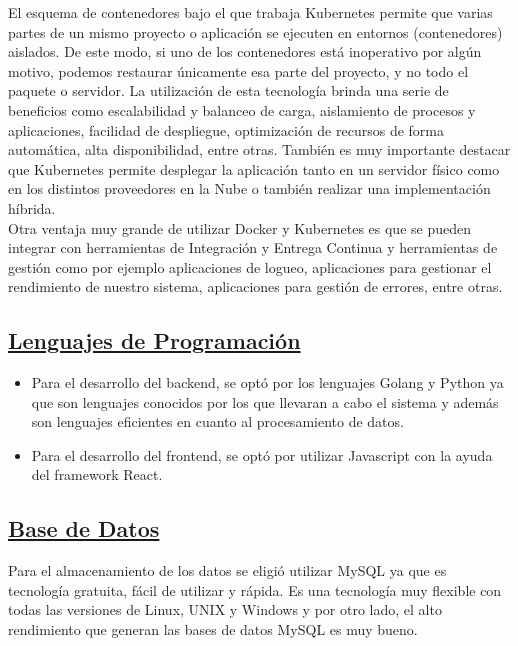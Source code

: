 El esquema de contenedores bajo el que trabaja Kubernetes permite que varias partes de un mismo proyecto o aplicación se ejecuten en entornos (contenedores) aislados. De este modo, si uno de los contenedores está inoperativo por algún motivo, podemos restaurar únicamente esa parte del proyecto, y no todo el paquete o servidor. La utilización de esta tecnología brinda una serie de beneficios como escalabilidad y balanceo de carga, aislamiento de procesos y aplicaciones, facilidad de despliegue, optimización de recursos de forma automática, alta disponibilidad, entre otras. También es muy importante destacar que Kubernetes permite desplegar la aplicación tanto en un servidor físico como en los distintos proveedores en la Nube o también realizar una implementación híbrida.\\

Otra ventaja muy grande de utilizar Docker y Kubernetes es que se pueden integrar con herramientas de Integración y Entrega Continua y herramientas de gestión como por ejemplo aplicaciones de logueo, aplicaciones para gestionar el rendimiento de nuestro sistema, aplicaciones para gestión de errores, entre otras.\\


\subsection*{\underline{Lenguajes de Programación}}
\begin{itemize}
\item Para el desarrollo del backend, se optó por los lenguajes Golang y Python ya que son lenguajes conocidos por los que llevaran a cabo el sistema y además son lenguajes eficientes en cuanto al procesamiento de datos.
\item Para el desarrollo del frontend, se optó por utilizar Javascript con la ayuda del framework React.\\
\end{itemize}

\subsection*{\underline{Base de Datos}}

Para el almacenamiento de los datos se eligió utilizar MySQL ya que es tecnología gratuita, fácil de utilizar y rápida. Es una tecnología muy flexible con todas las versiones de Linux, UNIX y Windows y por otro lado, el alto rendimiento que generan las bases de datos MySQL es muy bueno.\\

